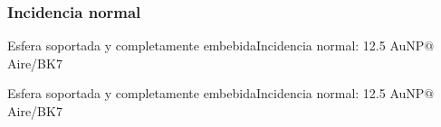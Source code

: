   \subsubsection{Incidencia normal}
    \begin{frame}{Esfera soportada y completamente embebida}{Incidencia normal: 12.5 AuNP$@$Aire/BK7}
    \begin{figure}
        \def\svgwidth{.95\textwidth}
    \end{figure}
    \end{frame}
    \begin{frame}{Esfera soportada y completamente embebida}{Incidencia normal: 12.5 AuNP$@$Aire/BK7}
    \renewcommand{\newcirc}{{\scaleobj{.625}{\circ}}}
    \begin{columns}
    \begin{figure}    \centering
        \def\svgwidth{.95\textwidth} \fontsize{4}{5}\selectfont
        \\[2em]
        \def\svgwidth{.95\textwidth}
    \end{figure}
    \begin{figure}\centering
      \def\svgwidth{.95 \textwidth}
      \tiny
    \end{figure}
    \end{columns}
    \end{frame}
